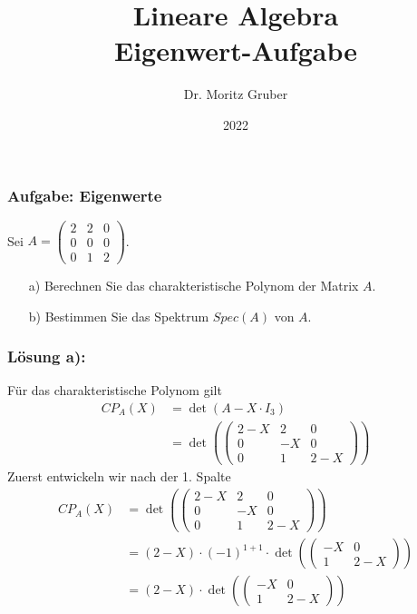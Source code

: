 

\title{Lineare Algebra\\[3mm] 
	\large Eigenwert-Aufgabe
}
\author{Dr. Moritz Gruber} 
\date{2022}



%
\begin{frame}[plain] 
 \titlepage
\end{frame}
%
\begin{frame}\frametitle{Aufgabe: Eigenwerte}
%
Sei $A=	\begin{pmatrix}
		2	&2&0	\\
		0	&0	&0	\\
		0	&1	&2
	\end{pmatrix}$. 
\begin{itemize}
\vfill
\item[a)] Berechnen Sie das charakteristische Polynom der Matrix $A$.\\\vspace{5mm}
\item[b)] Bestimmen Sie das Spektrum $Spec(A)$ von $A$.
\end{itemize}

%
\end{frame}
%
%
\begin{frame}\frametitle{Lösung a):}
Für das charakteristische Polynom gilt 
\begin{align*}
CP_A(X)&=\det(A-X\cdot I_3)\\
&=\det(\begin{pmatrix}
		2-X	&2&0	\\
		0	&-X	&0	\\
		0	&1	&2-X
	\end{pmatrix})
\end{align*}\pause
Zuerst entwickeln wir nach der 1. Spalte \pause
\begin{align*}
CP_A(X)&=\det(\begin{pmatrix}
		2-X	&2&0	\\
		0	&-X	&0	\\
		0	&1	&2-X
	\end{pmatrix})\\
&= (2-X)\cdot(-1)^{1+1}\cdot \det(\begin{pmatrix}
		-X	&0	\\
		1	&2-X
	\end{pmatrix})\\
&=(2-X)\cdot\det(\begin{pmatrix}
		-X	&0	\\
		1	&2-X
	\end{pmatrix})\\
\end{align*}
\end{frame}
